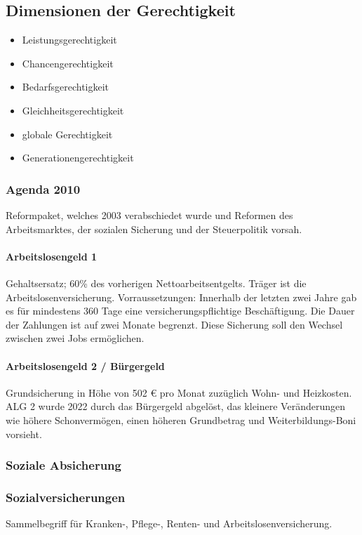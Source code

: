 \documentclass{article}
\begin{document}
	\subsection{Dimensionen der Gerechtigkeit}
	
	\begin{itemize}
		\item Leistungsgerechtigkeit
		\item Chancengerechtigkeit
		\item Bedarfsgerechtigkeit
		\item Gleichheitsgerechtigkeit
		\item globale Gerechtigkeit
		\item Generationengerechtigkeit
	\end{itemize}

	\subsubsection{Agenda 2010}
	Reformpaket, welches 2003 verabschiedet wurde und Reformen des Arbeitsmarktes, der sozialen Sicherung und der Steuerpolitik vorsah.

	\paragraph{Arbeitslosengeld 1}
	Gehaltsersatz; 60\% des vorherigen Nettoarbeitsentgelts. Träger ist die Arbeitslosenversicherung. Vorraussetzungen: Innerhalb der letzten zwei Jahre gab es für mindestens 360 Tage eine versicherungspflichtige Beschäftigung. Die Dauer der Zahlungen ist auf zwei Monate begrenzt. Diese Sicherung soll den Wechsel zwischen zwei Jobs ermöglichen.

	\paragraph{Arbeitslosengeld 2 / Bürgergeld}
	Grundsicherung in Höhe von 502 € pro Monat zuzüglich Wohn- und Heizkosten. ALG 2 wurde 2022 durch das Bürgergeld abgelöst, das kleinere Veränderungen wie höhere Schonvermögen, einen höheren Grundbetrag und Weiterbildungs-Boni vorsieht.

	\subsubsection{Soziale Absicherung}

	\subsubsection{Sozialversicherungen}
	Sammelbegriff für Kranken-, Pflege-, Renten- und Arbeitslosenversicherung.
\end{document}
